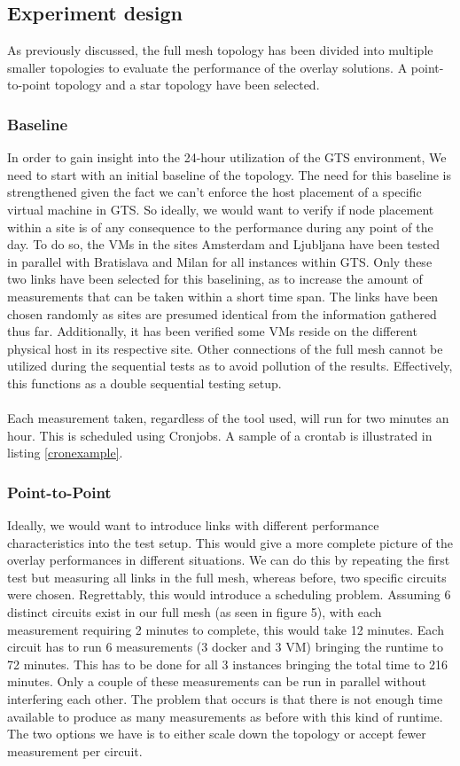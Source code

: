 \subsection{Experiment design}
As previously discussed, the full mesh topology has been divided into multiple smaller topologies to evaluate the performance of the overlay solutions. A point-to-point topology and a star topology have been selected.  

\subsubsection{Baseline}
In order to gain insight into the 24-hour utilization of the GTS environment, We need to start with an initial baseline of the topology. The need for this baseline is strengthened given the fact we can't enforce the host placement of a specific virtual machine in GTS. So ideally, we would want to verify if node placement within a site is of any consequence to the performance during any point of the day. To do so, the VMs in the sites Amsterdam and Ljubljana have been tested in parallel with Bratislava and Milan for all instances within GTS. Only these two links have been selected for this baselining, as to increase the amount of measurements that can be taken within a short time span. The links have been chosen randomly as sites are presumed identical from the information gathered thus far. Additionally, it has been verified some VMs reside on the different physical host in its respective site. Other connections of the full mesh cannot be utilized during the sequential tests as to avoid pollution of the results. Effectively, this functions as a double sequential testing setup.
\\
\\
Each measurement taken, regardless of the tool used, will run for two minutes an hour. This is scheduled using Cronjobs. A sample of a crontab is illustrated in listing \ref{cronexample}.

\subsubsection{Point-to-Point}
Ideally, we would want to introduce links with different performance characteristics into the test setup. This would give a more complete picture of the overlay performances in different situations. We can do this by repeating the first test but measuring all links in the full mesh, whereas before, two specific circuits were chosen.
Regrettably, this would introduce a scheduling problem.
Assuming 6 distinct circuits exist in our full mesh (as seen in figure 5), with each measurement requiring 2 minutes to complete, this would take 12 minutes. Each circuit has to run 6 measurements (3 docker and 3 VM) bringing the runtime to 72 minutes. This has to be done for all 3 instances bringing the total time to 216 minutes. Only a couple of these measurements can be run in parallel without interfering each other. The problem that occurs is that there is not enough time available to produce as many measurements as before with this kind of runtime. The two options we have is to either scale down the topology or accept fewer measurement per circuit.

